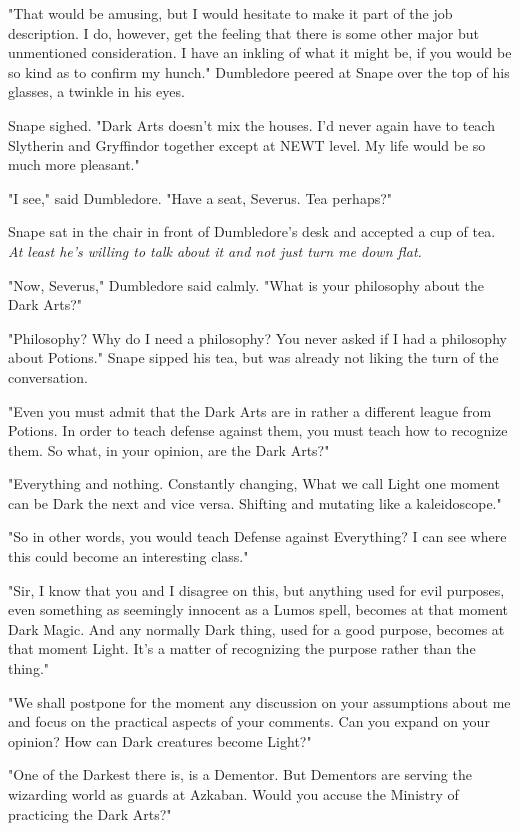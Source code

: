 \documentclass[a4paper,11pt]{article}
\begin{document}
"That would be amusing, but I would hesitate to make it part of the job description. I do, however, get the feeling that there is some other major but unmentioned consideration. I have an inkling of what it might be, if you would be so kind as to confirm my hunch." Dumbledore peered at Snape over the top of his glasses, a twinkle in his eyes.

Snape sighed. "Dark Arts doesn't mix the houses. I'd never again have to teach Slytherin and Gryffindor together except at NEWT level. My life would be so much more pleasant."

"I see," said Dumbledore. "Have a seat, Severus. Tea perhaps?"

Snape sat in the chair in front of Dumbledore's desk and accepted a cup of tea. \emph{At least he's willing to talk about it and not just turn me down flat.}

"Now, Severus," Dumbledore said calmly. "What is your philosophy about the Dark Arts?"

"Philosophy? Why do I need a philosophy? You never asked if I had a philosophy about Potions." Snape sipped his tea, but was already not liking the turn of the conversation.

"Even you must admit that the Dark Arts are in rather a different league from Potions. In order to teach defense against them, you must teach how to recognize them. So what, in your opinion, are the Dark Arts?"

"Everything and nothing. Constantly changing, What we call Light one moment can be Dark the next and vice versa. Shifting and mutating like a kaleidoscope."

"So in other words, you would teach Defense against Everything? I can see where this could become an interesting class."

"Sir, I know that you and I disagree on this, but anything used for evil purposes, even something as seemingly innocent as a Lumos spell, becomes at that moment Dark Magic. And any normally Dark thing, used for a good purpose, becomes at that moment Light. It's a matter of recognizing the purpose rather than the thing."

"We shall postpone for the moment any discussion on your assumptions about me and focus on the practical aspects of your comments. Can you expand on your opinion? How can Dark creatures become Light?"

"One of the Darkest there is, is a Dementor. But Dementors are serving the wizarding world as guards at Azkaban. Would you accuse the Ministry of practicing the Dark Arts?"
\end{document}
